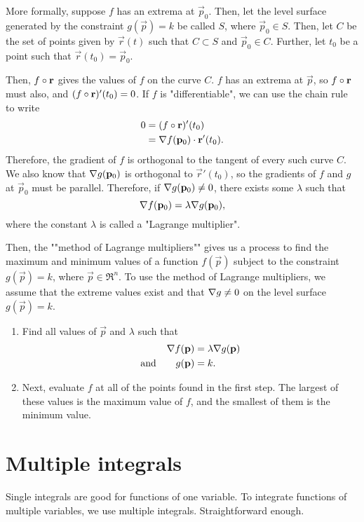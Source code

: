 \documentclass[knowledge]{rbt-mathnotes}
\begin{document}
More formally, suppose $f$ has an extrema at $\vec p_0$. Then, let the level
surface generated by the constraint $g(\vec p) = k$ be called $S$, where
$\vec p_0 \in S$. Then, let $C$ be the set of points given by $\vec r(t)$ such
that $C \subset S$ and $\vec p_0 \in C$. Further, let $t_0$ be a point such
that $\vec r(t_0) = \vec p_0$.

Then, $f \circ \mathbf{r}$ gives the values of $f$ on the curve $C$. $f$ has an
extrema at $\vec p$, so $f \circ \mathbf{r}$ must also, and $(f \circ \mathbf{r})'(t_0) = 0$. If $f$ is "differentiable", we can use the chain rule to
write
\begin{alignat*}{1}
  0 &= (f \circ \mathbf{r})'(t_0) \\
  &= \nabla f(\mathbf{p}_0) \cdot \mathbf{r}'(t_0).
\end{alignat*}
Therefore, the gradient of $f$ is orthogonal to the tangent of every such
curve $C$. We also know that $\nabla g(\mathbf{p}_0)$ is orthogonal to $\vec
r'(t_0)$, so the gradients of $f$ and $g$ at $\vec p_0$ must be parallel.
Therefore, if $\nabla g(\mathbf{p}_0) \ne 0$, there exists some $\lambda$ such
that
\begin{equation}
  \nabla f(\mathbf{p}_0) = \lambda \nabla g(\mathbf{p}_0),
\end{equation}
where the constant $\lambda$ is called a "Lagrange multiplier".

Then, the ""method of Lagrange multipliers"" gives us a process to
find the maximum and minimum values of a function $f(\vec p)$ subject to the
constraint  $g(\vec p) = k$, where $\vec p \in \Re^n$. To use the method of
Lagrange multipliers, we assume that the extreme values exist and that
$\nabla g \ne 0$ on the level surface $g(\vec p) = k$.
\begin{enumerate}
  \item Find all values of $\vec p$ and $\lambda$ such that
  \begin{alignat*}{1}
    \nabla f(\mathbf{p}) &=  \lambda \nabla g(\mathbf{p}) \\
  \text{and}\qquad g(\mathbf{p}) &= k. \\
  \end{alignat*}

  \item Next, evaluate $f$ at all of the points found in the first step. The
  largest of these values is the maximum value of $f$, and the smallest of
  them is the minimum value.
\end{enumerate}

\chapter{Multiple integrals}
Single integrals are good for functions of one variable. To integrate
functions of multiple variables, we use multiple integrals. Straightforward
enough.
\end{document}
